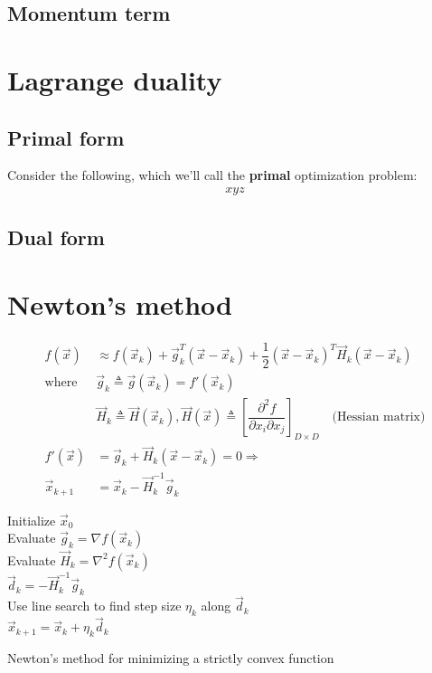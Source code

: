 \subsection{Momentum term}


\section{Lagrange duality}


\subsection{Primal form}
Consider the following, which we'll call the \textbf{primal} optimization problem:
\begin{eqnarray}
xyz
\end{eqnarray}


\subsection{Dual form}


\section{Newton's method}
\label{sec:Newtons-method}
\begin{align}
f(\vec{x})& \approx f(\vec{x}_k)+\vec{g}_k^T(\vec{x}-\vec{x}_k)+\dfrac{1}{2}(\vec{x}-\vec{x}_k)^T\vec{H}_k(\vec{x}-\vec{x}_k) \nonumber \\
\text{where } & \vec{g}_k \triangleq \vec{g}(\vec{x}_k)=f'(\vec{x}_k) \nonumber \\
              & \vec{H}_k \triangleq \vec{H}(\vec{x}_k), \vec{H}(\vec{x}) \triangleq \left[\dfrac{\partial^2 f}{\partial x_i \partial x_j}\right]_{D \times D} \quad \text{(Hessian matrix)} \nonumber \\
f'(\vec{x})& = \vec{g}_k+\vec{H}_k(\vec{x}-\vec{x}_k)=0 \Rightarrow  \label{eqn:newton-stationary-point} \\
\vec{x}_{k+1}& = \vec{x}_k-\vec{H}_k^{-1}\vec{g}_k
\end{align}

\begin{algorithm}[htbp]
    Initialize $\vec{x}_0$ \\
	
	 {
        Evaluate $\vec{g}_k=\nabla f(\vec{x}_k)$ \\
        Evaluate $\vec{H}_k=\nabla^2 f(\vec{x}_k)$ \\
        $\vec{d}_k=-\vec{H}_k^{-1}\vec{g}_k$ \\
        Use line search to find step size $\eta_k$ along $\vec{d}_k$ \\
        $\vec{x}_{k+1}=\vec{x}_k+\eta_k\vec{d}_k$
	}
	
\caption{Newton’s method for minimizing a strictly convex function}
\end{algorithm}


